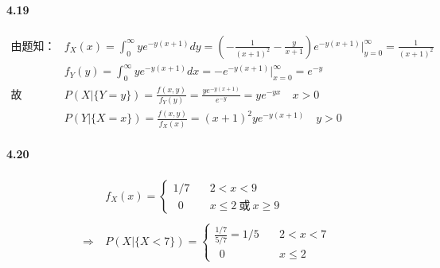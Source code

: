 \documentclass[
]{article}
\begin{document}
\hypertarget{header-n22}{%
\paragraph{4.19}\label{header-n22}}

\begin{align}

由题知：

&f_X(x) = \int_0^\infty ye^{-y(x+1)}dy={(-\frac{1}{(x+1)^2}-\frac{y}{x+1})e^{-y(x+1)}}\Big|_{y=0}^\infty=\frac{1}{(x+1)^2}

\\

&f_Y(y) = \int_0^\infty ye^{-y(x+1)}dx=-e^{-y(x+1)}\Big|_{x=0}^\infty=e^{-y}

\\



故\ &P(X|\{Y=y\}) =\frac{f(x,y)}{f_Y(y)}=\frac{ye^{-y(x+1)}}{e^{-y}}=ye^{-yx} \quad x>0\\

    &P(Y|\{X=x\}) =\frac{f(x,y)}{f_X(x)}={(x+1)^2ye^{-y(x+1)}}\quad y>0

\end{align}

\hypertarget{header-n24}{%
\paragraph{4.20}\label{header-n24}}

\begin{align}
&f_X(x)=\begin{cases}
1/7 \quad &2<x<9 \\
\ \ 0 &x\le2\ 或\ x \ge9
\end{cases}\\ \\
\Rightarrow \ &P(X|\{X<7\})=\begin{cases}\frac{1/7}{5/7}=1/5 \quad &2<x<7\\
\ \ 0 &x\le2\
\end{cases}

\end{align}
\end{document}
